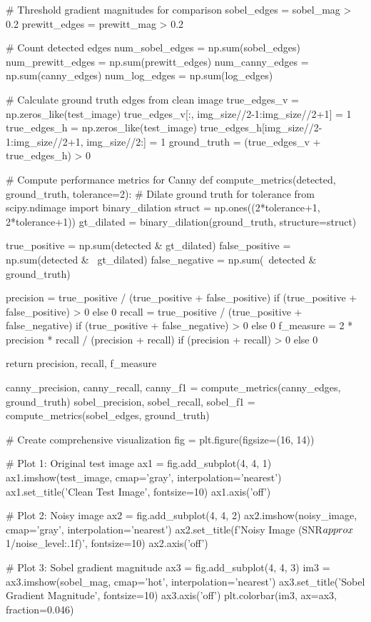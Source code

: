 \documentclass[a4paper, 11pt]{article}
\begin{document}
\begin{pycode}
# Threshold gradient magnitudes for comparison
sobel_edges = sobel_mag > 0.2
prewitt_edges = prewitt_mag > 0.2

# Count detected edges
num_sobel_edges = np.sum(sobel_edges)
num_prewitt_edges = np.sum(prewitt_edges)
num_canny_edges = np.sum(canny_edges)
num_log_edges = np.sum(log_edges)

# Calculate ground truth edges from clean image
true_edges_v = np.zeros_like(test_image)
true_edges_v[:, img_size//2-1:img_size//2+1] = 1
true_edges_h = np.zeros_like(test_image)
true_edges_h[img_size//2-1:img_size//2+1, img_size//2:] = 1
ground_truth = (true_edges_v + true_edges_h) > 0

# Compute performance metrics for Canny
def compute_metrics(detected, ground_truth, tolerance=2):
    # Dilate ground truth for tolerance
    from scipy.ndimage import binary_dilation
    struct = np.ones((2*tolerance+1, 2*tolerance+1))
    gt_dilated = binary_dilation(ground_truth, structure=struct)

    true_positive = np.sum(detected & gt_dilated)
    false_positive = np.sum(detected & ~gt_dilated)
    false_negative = np.sum(~detected & ground_truth)

    precision = true_positive / (true_positive + false_positive) if (true_positive + false_positive) > 0 else 0
    recall = true_positive / (true_positive + false_negative) if (true_positive + false_negative) > 0 else 0
    f_measure = 2 * precision * recall / (precision + recall) if (precision + recall) > 0 else 0

    return precision, recall, f_measure

canny_precision, canny_recall, canny_f1 = compute_metrics(canny_edges, ground_truth)
sobel_precision, sobel_recall, sobel_f1 = compute_metrics(sobel_edges, ground_truth)

# Create comprehensive visualization
fig = plt.figure(figsize=(16, 14))

# Plot 1: Original test image
ax1 = fig.add_subplot(4, 4, 1)
ax1.imshow(test_image, cmap='gray', interpolation='nearest')
ax1.set_title('Clean Test Image', fontsize=10)
ax1.axis('off')

# Plot 2: Noisy image
ax2 = fig.add_subplot(4, 4, 2)
ax2.imshow(noisy_image, cmap='gray', interpolation='nearest')
ax2.set_title(f'Noisy Image (SNR$\\approx${1/noise_level:.1f})', fontsize=10)
ax2.axis('off')

# Plot 3: Sobel gradient magnitude
ax3 = fig.add_subplot(4, 4, 3)
im3 = ax3.imshow(sobel_mag, cmap='hot', interpolation='nearest')
ax3.set_title('Sobel Gradient Magnitude', fontsize=10)
ax3.axis('off')
plt.colorbar(im3, ax=ax3, fraction=0.046)


\end{pycode}
\end{document}
